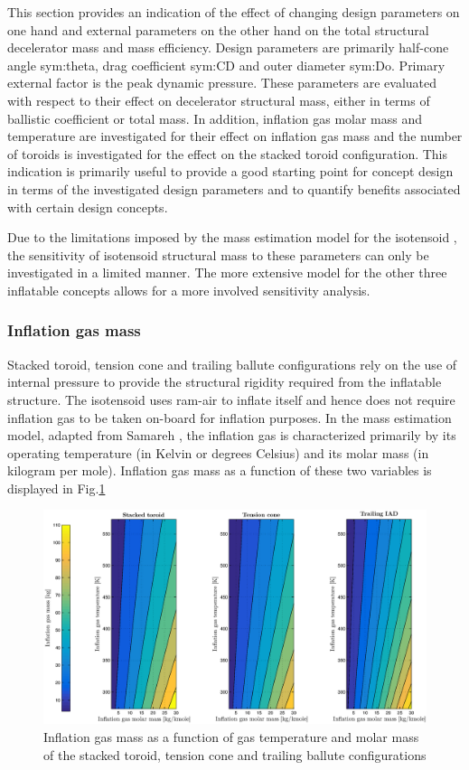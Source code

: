 This section provides an indication of the effect of changing design parameters on one hand and external parameters on the other hand on the total structural decelerator mass and mass efficiency. Design parameters are primarily half-cone angle \gls{sym:theta}, drag coefficient \gls{sym:CD} and outer diameter \gls{sym:Do}. Primary external factor is the peak dynamic pressure. These parameters are evaluated with respect to their effect on decelerator structural mass, either in terms of ballistic coefficient or total mass. In addition, inflation gas molar mass and temperature are investigated for their effect on inflation gas mass and the number of toroids is investigated for the effect on the stacked toroid configuration. This indication is primarily useful to provide a good starting point for concept design in terms of the investigated design parameters and to quantify benefits associated with certain design concepts. 

Due to the limitations imposed by the mass estimation model for the isotensoid \cite{Anderson1969}, the sensitivity of isotensoid structural mass to these parameters can only be investigated in a limited manner. The more extensive model for the other three inflatable concepts \cite{Samareh2011} allows for a more involved sensitivity analysis.

\subsubsection{Inflation gas mass}
Stacked toroid, tension cone and trailing ballute configurations rely on the use of internal pressure to provide the structural rigidity required from the inflatable structure. The isotensoid uses ram-air to inflate itself and hence does not require inflation gas to be taken on-board for inflation purposes. In the mass estimation model, adapted from Samareh \cite{Samareh2011}, the inflation gas is characterized primarily by its operating temperature (in Kelvin or degrees Celsius) and its molar mass (in kilogram per mole). Inflation gas mass as a function of these two variables is displayed in Fig.\ref{fig:inflmass}

\begin{figure}[H]
\hspace{-5mm}
\includegraphics[width = 1.1\textwidth]{Figure/gas_temp_mass.eps}
\caption{Inflation gas mass as a function of gas temperature and molar mass of the stacked toroid, tension cone and trailing ballute configurations}
\label{fig:inflmass}
\end{figure}

